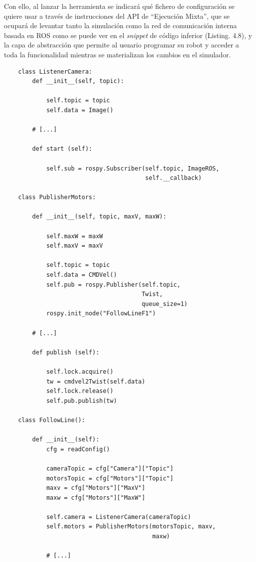 Con ello, al lanzar la herramienta se indicará qué fichero de configuración se quiere usar a través de instrucciones del API de ``Ejecución Mixta'', que se ocupará de levantar tanto la simulación como la red de comunicación interna basada en ROS como se puede ver en el \textit{snippet} de código inferior (Listing. 4.8), y la capa de abstracción que permite al usuario programar su robot y acceder a toda la funcionalidad mientras se materializan los cambios en el simulador.

\begin{verbatim}
    class ListenerCamera:
        def __init__(self, topic):
            
            self.topic = topic
            self.data = Image()
    
        # [...]
    
        def start (self):
     
            self.sub = rospy.Subscriber(self.topic, ImageROS,
                                        self.__callback)
    
    class PublisherMotors:
     
        def __init__(self, topic, maxV, maxW):
    
            self.maxW = maxW
            self.maxV = maxV
    
            self.topic = topic
            self.data = CMDVel()
            self.pub = rospy.Publisher(self.topic,
                                       Twist,
                                       queue_size=1)
            rospy.init_node("FollowLineF1")
    
        # [...]
    
        def publish (self):
    
            self.lock.acquire()
            tw = cmdvel2Twist(self.data)
            self.lock.release()
            self.pub.publish(tw)
    
    class FollowLine():
        
        def __init__(self):
            cfg = readConfig()
    
            cameraTopic = cfg["Camera"]["Topic"]
            motorsTopic = cfg["Motors"]["Topic"]
            maxv = cfg["Motors"]["MaxV"]
            maxw = cfg["Motors"]["MaxW"]
    
            self.camera = ListenerCamera(cameraTopic)
            self.motors = PublisherMotors(motorsTopic, maxv,
                                          maxw)
    
            # [...]
\end{verbatim}
\begin{lstlisting}[caption=Creación de la Red Interna de Comunicación]
\end{lstlisting}

